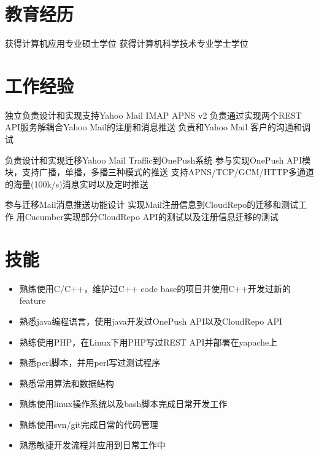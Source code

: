 \documentclass{resume}
\begin{document}
\begin{CJK}{UTF8}{gbsn}
\section{教育经历}
获得计算机应用专业硕士学位
获得计算机科学技术专业学士学位
 
\section{工作经验}
\workitems 
{独立负责设计和实现支持Yahoo Mail IMAP APNS v2}
{负责通过实现两个REST API服务解耦合Yahoo Mail的注册和消息推送}
{负责和Yahoo Mail 客户的沟通和调试}

\workitems 
{负责设计和实现迁移Yahoo Mail Traffic到OnePush系统}
{参与实现OnePush API模块，支持广播，单播，多播三种模式的推送}
{支持APNS/TCP/GCM/HTTP多通道的海量(100k/s)消息实时以及定时推送}

\workitems 
{参与迁移Mail消息推送功能设计}
{实现Mail注册信息到CloudRepo的迁移和测试工作}
{用Cucumber实现部分CloudRepo API的测试以及注册信息迁移的测试}

\section{技能}
\begin{itemize}
\item 熟练使用C/C++，维护过C++ code base的项目并使用C++开发过新的feature 
\item 熟悉java编程语言，使用java开发过OnePush API以及CloudRepo API
\item 熟练使用PHP，在Linux下用PHP写过REST API并部署在yapache上
\item 熟悉perl脚本，并用perl写过测试程序
\item 熟悉常用算法和数据结构
\item 熟练使用linux操作系统以及bash脚本完成日常开发工作
\item 熟练使用svn/git完成日常的代码管理
\item 熟悉敏捷开发流程并应用到日常工作中
\end{itemize}
\end{CJK}
\end{document}
